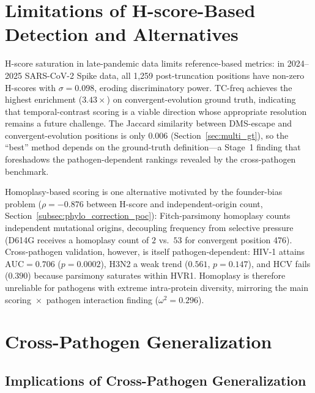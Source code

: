 \section{Limitations of H-score-Based Detection and Alternatives}
\label{sec:hscore_saturation}\label{sec:complementary_gt}\label{sec:homoplasy_scoring}\label{tab:homoplasy_validation}

H-score saturation in late-pandemic data limits reference-based metrics: in 2024--2025 SARS-CoV-2 Spike data, all 1,259 post-truncation positions have non-zero H-scores with $\sigma = 0.098$, eroding discriminatory power. TC-freq achieves the highest enrichment ($3.43\times$) on convergent-evolution ground truth, indicating that temporal-contrast scoring is a viable direction whose appropriate resolution remains a future challenge. The Jaccard similarity between DMS-escape and convergent-evolution positions is only $0.006$ (Section~\ref{sec:multi_gt}), so the ``best'' method depends on the ground-truth definition---a Stage~1 finding that foreshadows the pathogen-dependent rankings revealed by the cross-pathogen benchmark.

Homoplasy-based scoring is one alternative motivated by the founder-bias problem ($\rho = -0.876$ between H-score and independent-origin count, Section~\ref{subsec:phylo_correction_poc}): Fitch-parsimony homoplasy counts independent mutational origins, decoupling frequency from selective pressure (D614G receives a homoplasy count of $2$ vs.\ $53$ for convergent position 476). Cross-pathogen validation, however, is itself pathogen-dependent: HIV-1 attains $\mathrm{AUC} = 0.706$ ($p = 0.0002$), H3N2 a weak trend ($0.561$, $p = 0.147$), and HCV fails ($0.390$) because parsimony saturates within HVR1. Homoplasy is therefore unreliable for pathogens with extreme intra-protein diversity, mirroring the main scoring~$\times$~pathogen interaction finding ($\omega^2 = 0.296$).

\section{Cross-Pathogen Generalization}

\subsection{Implications of Cross-Pathogen Generalization}
\label{sec:cross_pathogen_implications}


